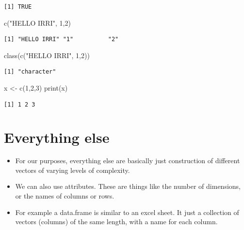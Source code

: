 \documentclass[
  letterpaper,
  DIV=11,
  numbers=noendperiod]{scrreprt}
\newenvironment{Shaded}{\begin{snugshade}}{\end{snugshade}}
\newcommand{\DecValTok}[1]{\textcolor[rgb]{0.68,0.00,0.00}{#1}}
\newcommand{\FunctionTok}[1]{\textcolor[rgb]{0.28,0.35,0.67}{#1}}
\newcommand{\NormalTok}[1]{\textcolor[rgb]{0.00,0.23,0.31}{#1}}
\newcommand{\OtherTok}[1]{\textcolor[rgb]{0.00,0.23,0.31}{#1}}
\newcommand{\StringTok}[1]{\textcolor[rgb]{0.13,0.47,0.30}{#1}}
\begin{document}
\begin{verbatim}
[1] TRUE
\end{verbatim}

\begin{Shaded}
\begin{Highlighting}[]
\FunctionTok{c}\NormalTok{(}\StringTok{"HELLO IRRI"}\NormalTok{, }\DecValTok{1}\NormalTok{,}\DecValTok{2}\NormalTok{)}
\end{Highlighting}
\end{Shaded}

\begin{verbatim}
[1] "HELLO IRRI" "1"          "2"         
\end{verbatim}

\begin{Shaded}
\begin{Highlighting}[]
\FunctionTok{class}\NormalTok{(}\FunctionTok{c}\NormalTok{(}\StringTok{"HELLO IRRI"}\NormalTok{, }\DecValTok{1}\NormalTok{,}\DecValTok{2}\NormalTok{))}
\end{Highlighting}
\end{Shaded}

\begin{verbatim}
[1] "character"
\end{verbatim}

\begin{Shaded}
\begin{Highlighting}[]
\NormalTok{x }\OtherTok{\textless{}{-}} \FunctionTok{c}\NormalTok{(}\DecValTok{1}\NormalTok{,}\DecValTok{2}\NormalTok{,}\DecValTok{3}\NormalTok{) }
\FunctionTok{print}\NormalTok{(x)}
\end{Highlighting}
\end{Shaded}

\begin{verbatim}
[1] 1 2 3
\end{verbatim}

\hypertarget{everything-else}{%
\section{Everything else}\label{everything-else}}

\begin{itemize}
\item
  For our purposes, everything else are basically just construction of
  different vectors of varying levels of complexity.
\item
  We can also use attributes. These are things like the number of
  dimensions, or the names of columns or rows.
\item
  For example a data.frame is similar to an excel sheet. It just a
  collection of vectors (columns) of the same length, with a name for
  each column.
\end{itemize}
\end{document}
